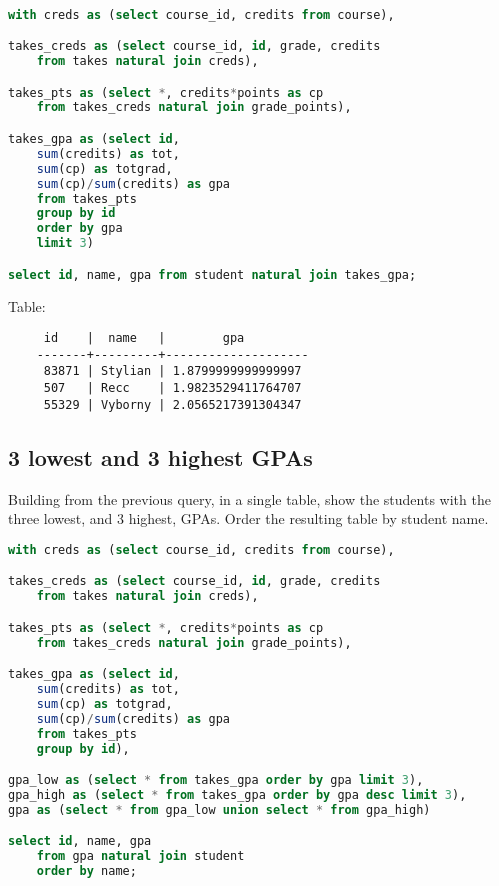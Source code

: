 \documentclass[11pt, oneside]{amsart}   	%
\begin{document}
\begin{lstlisting}[language=SQL]

with creds as (select course_id, credits from course),

takes_creds as (select course_id, id, grade, credits 
    from takes natural join creds), 

takes_pts as (select *, credits*points as cp 
    from takes_creds natural join grade_points),

takes_gpa as (select id, 
    sum(credits) as tot, 
    sum(cp) as totgrad, 
    sum(cp)/sum(credits) as gpa 
    from takes_pts 
    group by id
    order by gpa
    limit 3)

select id, name, gpa from student natural join takes_gpa;

\end{lstlisting}

Table: 
\begin{verbatim}
     id    |  name   |        gpa
    -------+---------+--------------------
     83871 | Stylian | 1.8799999999999997
     507   | Recc    | 1.9823529411764707
     55329 | Vyborny | 2.0565217391304347
\end{verbatim}

\subsection{3 lowest and 3 highest GPAs}

Building from the previous query, in a single table, show the students with the three lowest, and 3 highest, GPAs. Order the resulting table by student name.

\begin{lstlisting}[language=SQL]
    with creds as (select course_id, credits from course),

takes_creds as (select course_id, id, grade, credits 
    from takes natural join creds), 

takes_pts as (select *, credits*points as cp 
    from takes_creds natural join grade_points),

takes_gpa as (select id, 
    sum(credits) as tot, 
    sum(cp) as totgrad, 
    sum(cp)/sum(credits) as gpa 
    from takes_pts 
    group by id), 

gpa_low as (select * from takes_gpa order by gpa limit 3), 
gpa_high as (select * from takes_gpa order by gpa desc limit 3), 
gpa as (select * from gpa_low union select * from gpa_high)

select id, name, gpa
    from gpa natural join student
    order by name;
\end{lstlisting}
\end{document}
